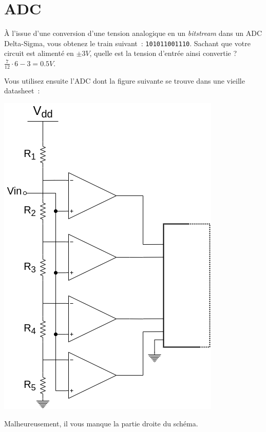 \documentclass{exam}
\author{DLH}
\begin{document}
\vfill
{}
\newpage






\section{ADC}


{
	À l'issue d'une conversion d'une tension analogique en un \textit{bitstream} dans un ADC Delta-Sigma, vous obtenez le train suivant~: \texttt{101011001110}. Sachant que votre circuit est alimenté en $\pm 3 V$, quelle est la tension d'entrée ainsi convertie ?
}
{
	$\frac{7}{12} \cdot 6 - 3 = 0.5 V$.
}

Vous utilisez ensuite l'ADC dont la figure suivante se trouve dans une vieille datasheet~:
\begin{center}
	\includegraphics[width=.3\paperwidth]{flash.png}
\end{center}
Malheureusement, il vous manque la partie droite du schéma.
\end{document}
